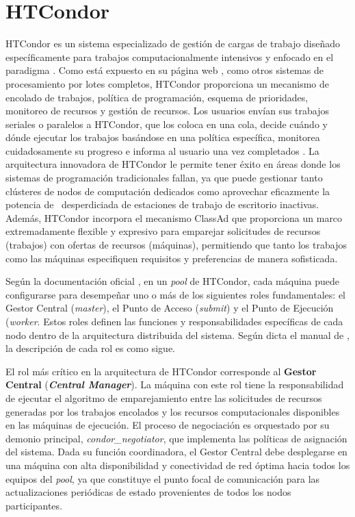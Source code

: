 \section{HTCondor}
\noindent
HTCondor es un sistema especializado de gestión de cargas de trabajo diseñado específicamente para trabajos computacionalmente intensivos y enfocado en el paradigma \HTC. Como está expuesto en su página web \citep{HTCondor-what-is-HTCondor}, como otros sistemas de procesamiento por lotes completos, HTCondor proporciona un mecanismo de encolado de trabajos, política de programación, esquema de prioridades, monitoreo de recursos y gestión de recursos. Los usuarios envían sus trabajos seriales o paralelos a HTCondor, que los coloca en una cola, decide cuándo y dónde ejecutar los trabajos basándose en una política específica, monitorea cuidadosamente su progreso e informa al usuario una vez completados \citep{HTCondor-what-is-HTCondor}. La arquitectura innovadora de HTCondor le permite tener éxito en áreas donde los sistemas de programación tradicionales fallan, ya que puede gestionar tanto clústeres de nodos de computación dedicados como aprovechar eficazmente la potencia de \CPU~desperdiciada de estaciones de trabajo de escritorio inactivas. Además, HTCondor incorpora el mecanismo ClassAd que proporciona un marco extremadamente flexible y expresivo para emparejar solicitudes de recursos (trabajos) con ofertas de recursos (máquinas), permitiendo que tanto los trabajos como las máquinas especifiquen requisitos y preferencias de manera sofisticada.

Según la documentación oficial \citep{HTCondor-roles}, en un \textit{pool} de HTCondor, cada máquina puede configurarse para desempeñar uno o más de los siguientes roles fundamentales: el Gestor Central (\textit{master}), el Punto de Acceso (\textit{submit}) y el Punto de Ejecución (\textit{worker}. Estos roles definen las funciones y responsabilidades específicas de cada nodo dentro de la arquitectura distribuida del sistema. Según dicta el manual de \cite{HTCondor-roles}, la descripción de cada rol es como sigue.

El rol más crítico en la arquitectura de HTCondor corresponde al \textbf{Gestor Central} (\textbf{\textit{Central Manager}}). La máquina con este rol tiene la responsabilidad de ejecutar el algoritmo de emparejamiento entre las solicitudes de recursos generadas por los trabajos encolados y los recursos computacionales disponibles en las máquinas de ejecución. El proceso de negociación es orquestado por su demonio principal, \textit{condor\_negotiator}, que implementa las políticas de asignación del sistema. Dada su función coordinadora, el Gestor Central debe desplegarse en una máquina con alta disponibilidad y conectividad de red óptima hacia todos los equipos del \textit{pool}, ya que constituye el punto focal de comunicación para las actualizaciones periódicas de estado provenientes de todos los nodos participantes.

